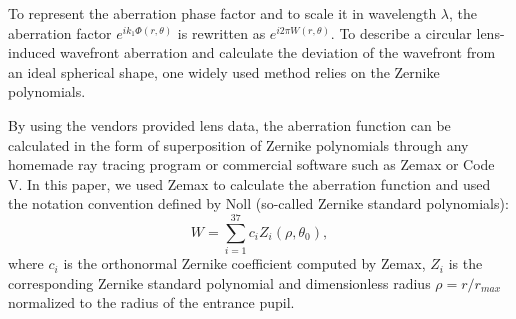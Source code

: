 \documentclass[9pt,twocolumn,twoside]{osajnl}
\begin{document}
To represent the aberration phase factor and to scale it in wavelength $\lambda$, the aberration factor $e^{ik_1\Phi(r,\theta)}$ is rewritten as $e^{i2\pi W(r,\theta)}$. To describe a circular lens-induced wavefront aberration and calculate the deviation of the wavefront from an ideal spherical shape, one widely used method relies on the Zernike polynomials.  %

By using the vendors provided lens data, the aberration function can be calculated in the form of superposition of Zernike polynomials through any homemade ray tracing program or commercial software such as Zemax or Code V. In this paper, we used Zemax \cite{Zemax} to calculate the aberration function and used the notation convention defined by Noll \cite{Noll1976} (so-called Zernike standard polynomials):
\begin{equation}\label{eq:22b}
	W = \sum_{i=1}^{37}c_iZ_i(\rho,\theta_0),
\end{equation}
where $c_i$ is the orthonormal Zernike coefficient computed by Zemax, $Z_i$ is the corresponding Zernike standard polynomial and dimensionless radius $\rho = r/r_{max}$ normalized to the radius of the entrance pupil.
\end{document}
